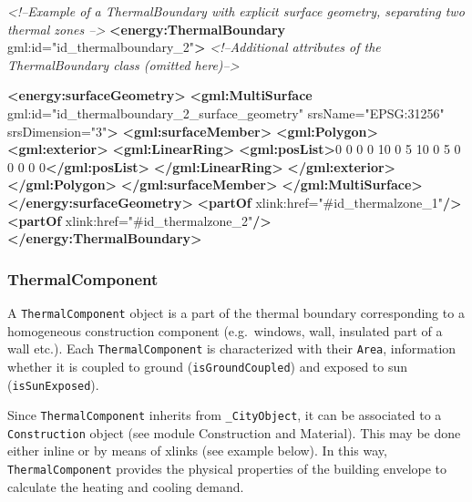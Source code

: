 \documentclass[a4paper,12pt]{article}
\newenvironment{Shaded}{}{}
\newcommand{\KeywordTok}[1]{\textcolor[rgb]{0.00,0.44,0.13}{\textbf{{#1}}}}
\newcommand{\StringTok}[1]{\textcolor[rgb]{0.25,0.44,0.63}{{#1}}}
\newcommand{\CommentTok}[1]{\textcolor[rgb]{0.38,0.63,0.69}{\textit{{#1}}}}
\newcommand{\OtherTok}[1]{\textcolor[rgb]{0.00,0.44,0.13}{{#1}}}
\newcommand{\NormalTok}[1]{{#1}}
\begin{document}
\begin{Shaded}
\begin{Highlighting}[]
\CommentTok{<!--Example of a ThermalBoundary with explicit surface geometry, separating two thermal zones -->}
\KeywordTok{<energy:ThermalBoundary}\OtherTok{ gml:id=}\StringTok{"id_thermalboundary_2"}\KeywordTok{>}
    \CommentTok{<!--Additional attributes of the ThermalBoundary class (omitted here)-->}

    \KeywordTok{<energy:surfaceGeometry>}
        \KeywordTok{<gml:MultiSurface}\OtherTok{ gml:id=}\StringTok{"id_thermalboundary_2_surface_geometry"}\OtherTok{ srsName=}\StringTok{"EPSG:31256"}\OtherTok{ srsDimension=}\StringTok{"3"}\KeywordTok{>}
            \KeywordTok{<gml:surfaceMember>}
                \KeywordTok{<gml:Polygon>}
                    \KeywordTok{<gml:exterior>}
                        \KeywordTok{<gml:LinearRing>}
                            \KeywordTok{<gml:posList>}\NormalTok{0 0 0 0 10 0 5 10 0 5 0 0 0 0 0}\KeywordTok{</gml:posList>}
                        \KeywordTok{</gml:LinearRing>}
                    \KeywordTok{</gml:exterior>}
                \KeywordTok{</gml:Polygon>}
            \KeywordTok{</gml:surfaceMember>}
        \KeywordTok{</gml:MultiSurface>}
    \KeywordTok{</energy:surfaceGeometry>}
    \KeywordTok{<partOf}\OtherTok{ xlink:href=}\StringTok{"#id_thermalzone_1"}\KeywordTok{/>}
    \KeywordTok{<partOf}\OtherTok{ xlink:href=}\StringTok{"#id_thermalzone_2"}\KeywordTok{/>}
\KeywordTok{</energy:ThermalBoundary>}
\end{Highlighting}
\end{Shaded}

\subsubsection{ThermalComponent}\label{thermalcomponent}

A \texttt{ThermalComponent} object is a part of the thermal boundary
corresponding to a homogeneous construction component (e.g.~windows,
wall, insulated part of a wall etc.). Each \texttt{ThermalComponent} is
characterized with their \texttt{Area}, information whether it is
coupled to ground (\texttt{isGroundCoupled}) and exposed to sun
(\texttt{isSunExposed}).

Since \texttt{ThermalComponent} inherits from \texttt{\_CityObject}, it
can be associated to a \texttt{Construction} object (see module
Construction and Material). This may be done either inline or by means
of xlinks (see example below). In this way, \texttt{ThermalComponent}
provides the physical properties of the building envelope to calculate
the heating and cooling demand.
\end{document}
